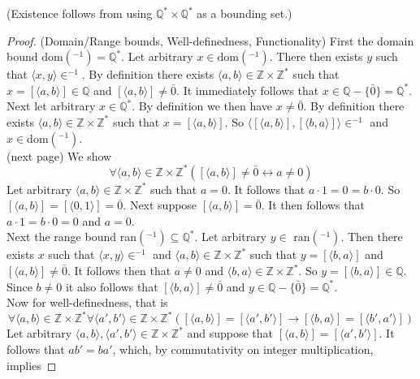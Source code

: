 \documentclass{report}
\begin{document}
\noindent(Existence follows from using $\mathbb Q^*\times\mathbb Q^*$ as a bounding set.)
\begin{proof}(Domain/Range bounds, Well-definedness, Functionality)
First the domain bound dom$(^{-1})=\mathbb Q^*$.
Let arbitrary $x\in\text{dom}(^{-1})$. There then exists $y$ such that $\langle x,y\rangle\in^{-1}$.
By definition there exists $\langle a,b\rangle\in\mathbb Z\times\mathbb Z^*$ such that $x=[\langle a,b\rangle]\in\mathbb Q$ and $[\langle a,b\rangle]\neq\bar0$. It immediately follows that 
$x\in\mathbb Q-\{\bar0\}=\mathbb Q^*$.
Next let arbitrary $x\in\mathbb Q^*$. By definition we then have $x\neq\bar0$. By definition there exists $\langle a,b\rangle\in\mathbb Z\times\mathbb Z^*$ such that $x=[\langle a,b\rangle]$. 
So $\langle[\langle a,b\rangle],[\langle b,a\rangle]\rangle\in^{-1}$ and $x\in\text{dom}(^{-1})$.\\
(next page)\newpage
We show
\begin{equation*}
\forall\langle a,b\rangle\in\mathbb Z\times\mathbb Z^*([\langle a,b\rangle]\neq\bar0\leftrightarrow a\neq0)
\end{equation*}
Let arbitrary $\langle a,b\rangle\in\mathbb Z\times\mathbb Z^*$ such that $a=0$. It follows that $a\cdot1=0=b\cdot0$. So $[\langle a,b\rangle]=[\langle 0,1\rangle]=\bar0$. Next suppose $[\langle a,b\rangle]=\bar0$. 
It then follows that $a\cdot1=b\cdot0=0$ and $a=0$.\\
\indent Next the range bound ran$(^{-1})\subseteq\mathbb Q^*$. Let arbitrary $y\in$ ran$(^{-1})$. Then there exists $x$ such that
$\langle x,y\rangle\in^{-1}$ and $\langle a,b\rangle\in\mathbb Z\times\mathbb Z^*$ such that $y=[\langle b,a\rangle]$ and 
$[\langle a,b\rangle]\neq\bar0$. It follows then that $a\neq0$ and $\langle b,a\rangle\in\mathbb Z\times\mathbb Z^*$. 
So $y=[\langle b,a\rangle]\in\mathbb Q$. Since $b\neq0$ it also follows that $[\langle b,a\rangle]\neq\bar0$ and $y\in\mathbb Q-\{\bar0\}=\mathbb Q^*$.\\
\indent Now for well-definedness, that is
\begin{equation*}
\forall\langle a,b\rangle\in\mathbb Z\times\mathbb Z^*
\forall\langle a',b'\rangle\in\mathbb Z\times\mathbb Z^*([\langle a,b\rangle]=[\langle a',b'\rangle]\to[\langle b,a\rangle]=[\langle b',a'\rangle])
\end{equation*}
Let arbitrary $\langle a,b\rangle,\langle a',b'\rangle\in\mathbb Z\times\mathbb Z^*$ and suppose that 
$[\langle a,b\rangle]=[\langle a',b'\rangle]$. It follows that
$ab'=ba'$, which, by commutativity on integer multiplication, implies

\end{proof}
\end{document}
